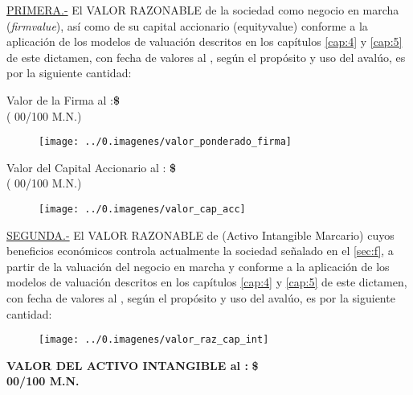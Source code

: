 \textcolor{principal}{\underline{PRIMERA.-}} El \textcolor{principal}{VALOR RAZONABLE} de la sociedad \textcolor{principal}{\empresaSolicitante} como negocio en marcha (\textit{\gls{firmvalue}}), as\'i como de su capital accionario (\gls{equityvalue}) conforme a la aplicaci\'on de los modelos de valuaci\'on descritos en los cap\'itulos \ref{cap:4} y \ref{cap:5} de este dictamen, con fecha de valores al \fechaValores, seg\'un el prop\'osito y uso del aval\'uo, es por la siguiente cantidad:\\


\begin{center}
\textcolor{principal}{Valor de la Firma al \fechaValoresCorto:}\textbf{\$\valorFirma{} \monedaCode}\\

(\textcolor{secundario}{\valorFirmaLetra{} \moneda{}  00/100 M.N.})

\begin{figure}[H]
\centering
\texttt{[image: ../0.imagenes/valor\_ponderado\_firma]}\end{figure}


\textcolor{principal}{Valor del Capital Accionario al \fechaValoresCorto:} \textbf{\$\valorCapital{} \monedaCode}\\
(\textcolor{secundario}{\valorCapitalLetra{} \moneda{} 00/100 M.N.})\\
\end{center}

\begin{figure}[H]
\centering
\texttt{[image: ../0.imagenes/valor\_cap\_acc]}

\end{figure}
\espacio{.5cm}



\textcolor{principal}{\underline{SEGUNDA.-}} El \textcolor{principal}{VALOR RAZONABLE} de \textcolor{principal}{\marca{}} (Activo Intangible Marcario) cuyos beneficios econ\'omicos controla actualmente la sociedad \textcolor{principal}{\empresaSolicitante} se\~nalado en el \autoref{sec:f},  a partir de la valuaci\'on del negocio en marcha y conforme a la aplicaci\'on de los modelos de valuaci\'on descritos en los cap\'itulos \ref{cap:4} y \ref{cap:5} de este dictamen, con fecha de valores al \textcolor{principal}{\textbf{\fechaValores}}, seg\'un el prop\'osito y uso del aval\'uo, es por la siguiente cantidad:\\

\begin{center}
\begin{figure}[H]
\centering
	\texttt{[image: ../0.imagenes/valor\_raz\_cap\_int]}
\end{figure}

\textcolor{principal}{\textbf{VALOR DEL ACTIVO INTANGIBLE al \fechaValoresCorto:}} \textbf{\$\valorActivoIntangible{} \monedaCode} \\


\textcolor{principal}{\textbf{\valorActivoIntangibleLetra{} \moneda{} 00/100 M.N.}}\\

\end{center}

\vspace{2cm}